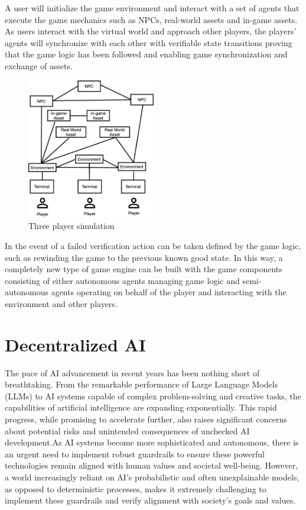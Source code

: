 \documentclass{article}
\begin{document}
\vspace{2mm}
A user will initialize the game environment and interact with a set of agents that execute the game mechanics such as NPCs, real-world assets and in-game assets. As users interact with the virtual world and approach other players, the players' agents will synchronize with each other with verifiable state transitions proving that the game logic has been followed and enabling game synchronization and exchange of assets.

\begin{figure}[H]
    \centering
    \includegraphics[width=0.5\textwidth]{game.png}
    \caption{Three player simulation}
    \label{fig:game}
\end{figure}

In the event of a failed verification action can be taken defined by the game logic, such as rewinding the game to the previous known good state. In this way, a completely new type of game engine can be built with the game components consisting of either autonomous agents managing game logic and semi-autonomous agents operating on behalf of the player and interacting with the environment and other players.

\section{Decentralized AI}



The pace of AI advancement in recent years has been nothing short of breathtaking. From the remarkable performance of Large Language Models (LLMs) to AI systems capable of complex problem-solving and creative tasks, the capabilities of artificial intelligence are expanding exponentially. This rapid progress, while promising to accelerate further, also raises significant concerns about potential risks and unintended consequences of unchecked AI development.As AI systems become more sophisticated and autonomous, there is an urgent need to implement robust guardrails to ensure these powerful technologies remain aligned with human values and societal well-being. However, a world increasingly reliant on AI's probabilistic and often unexplainable models, as opposed to deterministic processes, makes it extremely challenging to implement these guardrails and verify alignment with society's goals and values.
\end{document}
